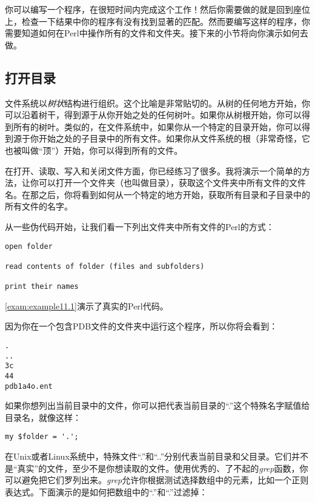 你可以编写一个程序，在很短时间内完成这个工作！然后你需要做的就是回到座位上，检查一下结果中你的程序有没有找到显著的匹配。然而要编写这样的程序，你需要知道如何在Perl中操作所有的文件和文件夹。接下来的小节将向你演示如何去做。

\subsection{打开目录}
文件系统以\textit{树状}结构进行组织。这个比喻是非常贴切的。从树的任何地方开始，你可以沿着树干，得到源于从你开始之处的任何树叶。如果你从树根开始，你可以得到所有的树叶。类似的，在文件系统中，如果你从一个特定的目录开始，你可以得到源于你开始之处的子目录中的所有文件。如果你从文件系统的根（非常奇怪，它也被叫做“顶”）开始，你可以得到所有的文件。

在打开、读取、写入和关闭文件方面，你已经练习了很多。我将演示一个简单的方法，让你可以打开一个文件夹（也叫做目录），获取这个文件夹中所有文件的文件名。在那之后，你将看到如何从一个特定的地方开始，获取所有目录和子目录中的所有文件的名字。

从一些伪代码开始，让我们看一下列出文件夹中所有文件的Perl的方式：

\begin{lstlisting}
open folder

read contents of folder (files and subfolders)

print their names
\end{lstlisting}

\autoref{exam:example11.1}演示了真实的Perl代码。



因为你在一个包含PDB文件的文件夹中运行这个程序，所以你将会看到：

\begin{lstlisting}
.
..
3c
44
pdb1a4o.ent
\end{lstlisting}

如果你想列出当前目录中的文件，你可以把代表当前目录的“.”这个特殊名字赋值给目录名，就像这样：

\begin{lstlisting}
my $folder = '.';
\end{lstlisting}

在Unix或者Linux系统中，特殊文件“.”和“..”分别代表当前目录和父目录。它们并不是“真实”的文件，至少不是你想读取的文件。使用优秀的、了不起的\textit{grep}函数，你可以避免把它们罗列出来。\textit{grep}允许你根据测试选择数组中的元素，比如一个正则表达式。下面演示的是如何把数组中的“.”和“.”过滤掉：

